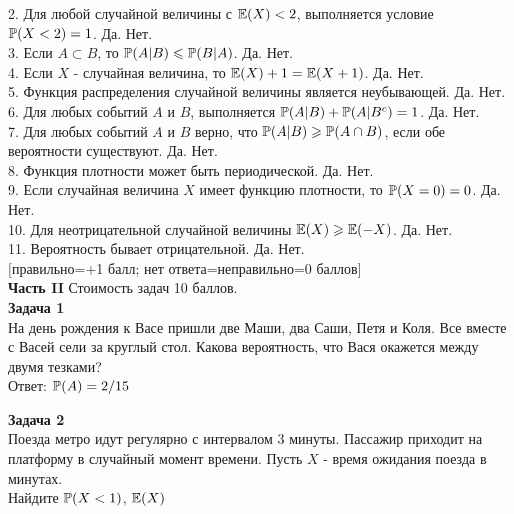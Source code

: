\documentclass[12pt, a4paper]{article}\usepackage[]{graphicx}\usepackage[]{color}
\begin{document}
2. Для любой случайной величины с $\E(X)<2$, выполняется условие $\P(X<2)=1$. Да. Нет. \\

3. Если $A\subset B$, то $\P(A|B)\le \P(B|A)$. Да. Нет. \\

4. Если  $X$  - случайная величина, то $\E(X)+1=\E(X+1)$. Да. Нет. \\

5. Функция распределения случайной величины является неубывающей. Да. Нет. \\

6. Для любых событий $A$ и $B$, выполняется $\P(A|B)+\P(A|B^{c})=1$. Да. Нет. \\

7. Для любых событий  $A$  и  $B$  верно, что $\P(A|B)\ge \P(A\cap
B)$, если обе вероятности существуют. Да. Нет. \\

8. Функция плотности может быть периодической. Да. Нет. \\

9. Если случайная величина $X$ имеет функцию плотности, то $\P(X=0)=0$. Да. Нет. \\

10. Для неотрицательной случайной величины $\E(X)\ge \E(-X)$. Да.
Нет. \\

11. Вероятность бывает отрицательной. Да. Нет. \\


$[$правильно=+1 балл; нет ответа=неправильно=0 баллов$]$ \\



\textbf{Часть II} Стоимость задач 10 баллов. \\


\textbf{Задача 1} \\ %
На день рождения к Васе пришли две Маши, два Саши, Петя и Коля. Все вместе с Васей сели за круглый стол. Какова вероятность, что Вася окажется между двумя тезками? \\

Ответ: $\P(A)=2/15$

\textbf{Задача 2} \\ %
Поезда метро идут регулярно с интервалом 3 минуты. Пассажир
приходит на платформу в случайный момент времени. Пусть $X$ -
время ожидания поезда в минутах. \\
Найдите $\P(X<1)$, $\E(X)$ \\
\end{document}
